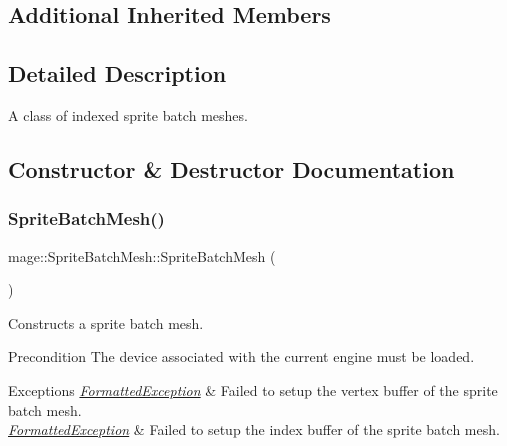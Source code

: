 \subsection*{Additional Inherited Members}


\subsection{Detailed Description}
A class of indexed sprite batch meshes. 

\subsection{Constructor \& Destructor Documentation}
\hypertarget{classmage_1_1_sprite_batch_mesh_ae5b2219aa3d5bbfb216036dad9c12e5d}{}\label{classmage_1_1_sprite_batch_mesh_ae5b2219aa3d5bbfb216036dad9c12e5d} 
\subsubsection{\texorpdfstring{Sprite\+Batch\+Mesh()}{SpriteBatchMesh()}\hspace{0.1cm}{\footnotesize\ttfamily [1/4]}}
{\footnotesize\ttfamily mage\+::\+Sprite\+Batch\+Mesh\+::\+Sprite\+Batch\+Mesh (\begin{DoxyParamCaption}{ }\end{DoxyParamCaption})}

Constructs a sprite batch mesh.

\begin{DoxyPrecond}{Precondition}
The device associated with the current engine must be loaded. 
\end{DoxyPrecond}

\begin{DoxyExceptions}{Exceptions}
{\em \hyperlink{classmage_1_1_formatted_exception}{Formatted\+Exception}} & Failed to setup the vertex buffer of the sprite batch mesh. \\
\hline
{\em \hyperlink{classmage_1_1_formatted_exception}{Formatted\+Exception}} & Failed to setup the index buffer of the sprite batch mesh. \\
\hline
\end{DoxyExceptions}
\hypertarget{classmage_1_1_sprite_batch_mesh_a3df41f79eb6080be26acceb4d283a913}{}\label{classmage_1_1_sprite_batch_mesh_a3df41f79eb6080be26acceb4d283a913} 

